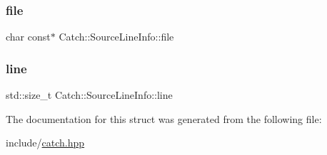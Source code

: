 \subsubsection{\texorpdfstring{file}{file}}
{\footnotesize\ttfamily char const$\ast$ Catch\+::\+Source\+Line\+Info\+::file}

\mbox{\label{struct_catch_1_1_source_line_info_a841e5d696c7b9cde24e45e61dd979c77}} 
\subsubsection{\texorpdfstring{line}{line}}
{\footnotesize\ttfamily std\+::size\+\_\+t Catch\+::\+Source\+Line\+Info\+::line}



The documentation for this struct was generated from the following file\+:\begin{DoxyCompactItemize}
\item 
include/\mbox{\hyperlink{catch_8hpp}{catch.\+hpp}}\end{DoxyCompactItemize}
